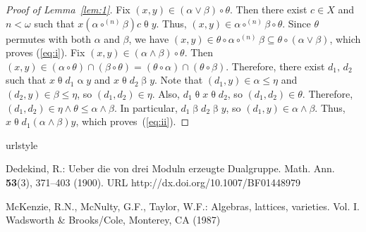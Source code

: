 \documentclass[11pt,reqno]{amsart}
\theoremstyle{plain}
\theoremstyle{definition}
\theoremstyle{remark}
\newcommand{\<}{\ensuremath{\langle}}
\renewcommand{\>}{\ensuremath{\rangle}}
\newcommand{\rel}[1]{\ensuremath{\mathbin{#1}}}
\renewcommand{\leq}{\ensuremath{\leqslant}}
\newcommand{\meet}{\ensuremath{\wedge}}
\newcommand{\join}{\ensuremath{\vee}}
\begin{document}
\begin{proof}[Proof of Lemma~\ref{lem:1}]
Fix $(x,y) \in (\alpha \join \beta) \circ \theta$.  Then there exist $c \in X$
and $n< \omega$ such that $x \rel{(\alpha \circ^{(n)}\beta)} c \rel{\theta} y$.
Thus, $(x,y) \in \alpha \circ^{(n)}\beta \circ \theta$.  Since $\theta$ permutes
with both $\alpha$ and $\beta$, we have $(x,y) \in \theta \circ \alpha
\circ^{(n)}\beta \subseteq \theta \circ (\alpha \join \beta)$, which proves
(\ref{eq:i}).
Fix $(x,y) \in (\alpha \meet \beta) \circ \theta$.  Then 
$(x,y) \in (\alpha \circ \theta) \cap (\beta \circ \theta) = 
(\theta \circ \alpha ) \cap (\theta \circ \beta)$.  Therefore, there exist $d_1,
\,d_2$ such that 
$x \rel{\theta} d_1 \rel{\alpha} y$ and 
$x \rel{\theta} d_2 \rel{\beta} y$.  Note that $(d_1, y) \in \alpha \leq \eta$ and 
$(d_2, y) \in \beta \leq \eta$, so $(d_1, d_2) \in \eta$.  Also, $d_1
\rel{\theta} x \rel{\theta} d_2$, so $(d_1, d_2) \in \theta$.  Therefore, 
$(d_1, d_2) \in \eta \meet \theta \leq \alpha \meet \beta$.
In particular, 
$d_1 \rel{\beta} d_2 \rel{\beta} y$, so
$(d_1,y)\in \alpha \meet \beta$.
% 
Thus, $x\rel{\theta} d_1 \rel{(\alpha\meet \beta)} y$, which proves~(\ref{eq:ii}).

\end{proof}

% 
% 
\def\cprime{$'$} \def\cprime{$'$}
  \def\ocirc#1{\ifmmode\setbox0=\hbox{$#1$}\dimen0=\ht0 \advance\dimen0
  by1pt\rlap{\hbox to\wd0{\hss\raise\dimen0
  \hbox{\hskip.2em$\scriptscriptstyle\circ$}\hss}}#1\else {\accent"17 #1}\fi}
\begin{thebibliography}{1}
\providecommand{\url}[1]{{#1}}
\providecommand{\urlprefix}{URL }
\expandafter\ifx\csname urlstyle\endcsname\relax
  \providecommand{\doi}[1]{DOI~\discretionary{}{}{}#1}\else
  \providecommand{\doi}{DOI~\discretionary{}{}{}\begingroup
  \urlstyle{rm}\Url}\fi

Dedekind, R.: Ueber die von drei {M}oduln erzeugte {D}ualgruppe.
\newblock Math. Ann. \textbf{53}(3), 371--403 (1900).
\newblock \urlprefix\url{http://dx.doi.org/10.1007/BF01448979}

McKenzie, R.N., McNulty, G.F., Taylor, W.F.: Algebras, lattices, varieties.
  {V}ol. {I}.
\newblock Wadsworth \& Brooks/Cole, Monterey, CA (1987)

\end{thebibliography}
\end{document}
